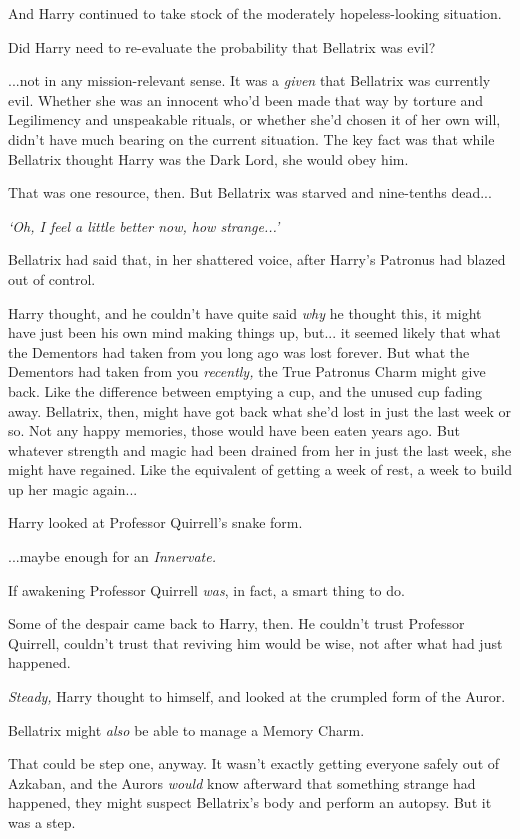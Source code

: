 And Harry continued to take stock of the moderately hopeless-looking
situation.

Did Harry need to re-evaluate the probability that Bellatrix was evil?

...not in any mission-relevant sense. It was a \emph{given} that
Bellatrix was currently evil. Whether she was an innocent who'd been
made that way by torture and Legilimency and unspeakable rituals, or
whether she'd chosen it of her own will, didn't have much bearing on the
current situation. The key fact was that while Bellatrix thought Harry
was the Dark Lord, she would obey him.

That was one resource, then. But Bellatrix was starved and nine-tenths
dead...

\emph{`Oh, I feel a little better now, how strange...'}

Bellatrix had said that, in her shattered voice, after Harry's Patronus
had blazed out of control.

Harry thought, and he couldn't have quite said \emph{why} he thought
this, it might have just been his own mind making things up, but...
it seemed likely that what the Dementors had taken from you long ago was
lost forever. But what the Dementors had taken from you \emph{recently,}
the True Patronus Charm might give back. Like the difference between
emptying a cup, and the unused cup fading away. Bellatrix, then, might
have got back what she'd lost in just the last week or so. Not any happy
memories, those would have been eaten years ago. But whatever strength
and magic had been drained from her in just the last week, she might
have regained. Like the equivalent of getting a week of rest, a week to
build up her magic again...

Harry looked at Professor Quirrell's snake form.

...maybe enough for an \emph{Innervate.}

If awakening Professor Quirrell \emph{was}, in fact, a smart thing to
do.

Some of the despair came back to Harry, then. He couldn't trust
Professor Quirrell, couldn't trust that reviving him would be wise, not
after what had just happened.

\emph{Steady,} Harry thought to himself, and looked at the crumpled form
of the Auror.

Bellatrix might \emph{also} be able to manage a Memory Charm.

That could be step one, anyway. It wasn't exactly getting everyone
safely out of Azkaban, and the Aurors \emph{would} know afterward that
something strange had happened, they might suspect Bellatrix's body and
perform an autopsy. But it was a step.

